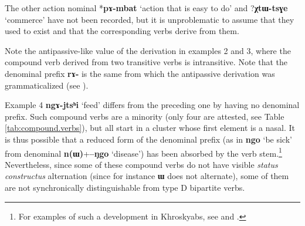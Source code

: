 \documentclass[oneside,a4paper,11pt]{article}
\newcommand{\ipa}[1]{{\phon\textbf{#1}}}
\newcommand{\jpg}[2]{\ipa{#1} `#2'}
\begin{document}
The other action nominal *\ipa{pɤ-mbat} `action that is easy to do' and ?\ipa{χtɯ-tsɣe} `commerce' have not been recorded, but it is unproblematic to assume that they used to exist and that the corresponding verbs derive from them.

Note the antipassive-like value of the derivation in examples 2 and 3, where the compound verb derived from two transitive verbs is intransitive. Note that the denominal prefix \ipa{rɤ-} is the same from which the antipassive derivation was grammaticalized (see  \citealt{jacques14antipassive}).

Example 4 \jpg{ngɤ-jtsʰi}{feed} differs from the preceding one by having no denominal prefix. Such compound verbs are a minority (only four are attested, see Table \ref{tab:compound.verbs}), but all start in a cluster whose first element is a nasal. It is thus possible that a reduced form of the denominal prefix (as in \jpg{ngo}{be sick} from denominal \ipa{n(ɯ)}+\jpg{--ŋgo}{disease}) has been absorbed by the verb stem.\footnote{For examples of such a development in Khroskyabs, see \citet{jacques12incorp} and \citealt{lai13affixale}. } Nevertheless, since some of these compound verbs do not have visible \textit{status constructus} alternation (since for instance \ipa{ɯ} does not alternate), some of them are not synchronically distinguishable from type D bipartite verbs.
\end{document}
